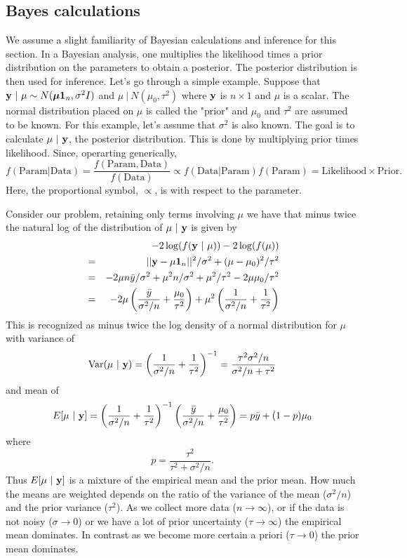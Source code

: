 \subsection{Bayes calculations}
We assume a slight familiarity of Bayesian calculations and inference for this section.
In a Bayesian analysis, one multiplies the likelihood times a prior distribution
on the parameters to obtain a posterior. The posterior distribution is then used for
inference. Let's go through a simple example.
Suppose that $\mathbf{y} ~|~ \mu \sim N(\boldsymbol{\mu} \mathbf{1}_n, \sigma^2 I)$ and
$\mu ~|~ N(\mu_0, \tau^2)$ where $\mathbf{y}$ is $n \times 1$ and $\mu$ is a scalar. The
normal distribution placed on $\mu$ is called the "prior" and $\mu_0$ and $\tau^2$ 
are assumed to be known. For this example, let's assume that $\sigma^2$ is also
known. The goal is to calculate
$\mu ~|~ \mathbf{y}$, the posterior distribution. This is done by multiplying prior times
likelihood. Since, operarting generically,
$$
f(\mbox{Param} | \mbox{Data}) = \frac{f(\mbox{Param}, \mbox{Data})}{f(\mbox{Data})} 
\propto f(\mbox{Data} | \mbox{Param}) f(\mbox{Param}) = \mbox{Likelihood} \times \mbox{Prior}.
$$
Here, the proportional symbol, $\propto$, is with respect to the parameter.

Consider our problem, retaining only terms involving $\mu$ we have that minus twice the natural log of the
distribution of  $\mu ~|~ \mathbf{y}$ is given by
\begin{eqnarray*}
&   & -2 \log(f(\mathbf{y} ~|~ \mu)) - 2 \log(f(\mu)) \\
& = & ||\mathbf{y} - \mu \mathbf{1}_n||^2 / \sigma^2  + (\mu - \mu_0)^2 / \tau^2 \\
& = & -2 \mu n \bar y / \sigma^2 + \mu^2 n / \sigma^2 + \mu^2 / \tau^2 - 2 \mu \mu_0 / \tau^2 \\
& = & -2 \mu \left(
\frac{\bar y}{\sigma^2 / n} + \frac{\mu_0}{\tau^2}\right)
+ \mu^2 \left(
\frac{1}{\sigma^2 / n} + \frac{1}{\tau^2}
\right)
\end{eqnarray*}
This is recognized as minus twice the log density of a normal distribution for $\mu$ with variance
of 
$$
\mbox{Var}(\mu ~|~ \mathbf{y}) =
\left(
\frac{1}{\sigma^2 / n} + \frac{1}{\tau^2}
\right)^{-1}
=\frac{\tau^2 \sigma^2 / n}{\sigma^2 / n + \tau^2}
$$
and mean of
$$
E[\mu ~|~ \mathbf{y}] = \left(
\frac{1}{\sigma^2 / n} + \frac{1}{\tau^2}
\right)^{-1}
\left(
\frac{\bar y}{\sigma^2 / n} + \frac{\mu_0}{\tau^2}\right)
= p \bar y + (1 - p) \mu_0
$$
where 
$$
p = \frac{\tau^2}{\tau^2 + \sigma^2 /n }.
$$
Thus $E[\mu ~|~ \mathbf{y}]$ is a mixture of the empirical mean and the prior mean. How much 
the means are weighted depends on the ratio of the variance of the mean ($\sigma^2/n$)
and the prior variance ($\tau^2$). As we collect more data ($n \rightarrow \infty$), or if the
data is not noisy
($\sigma \rightarrow 0$) or we have a lot of prior uncertainty ($\tau \rightarrow \infty$) the empirical mean dominates. In contrast as we become more certain a priori
($\tau \rightarrow 0$) the prior mean dominates.

